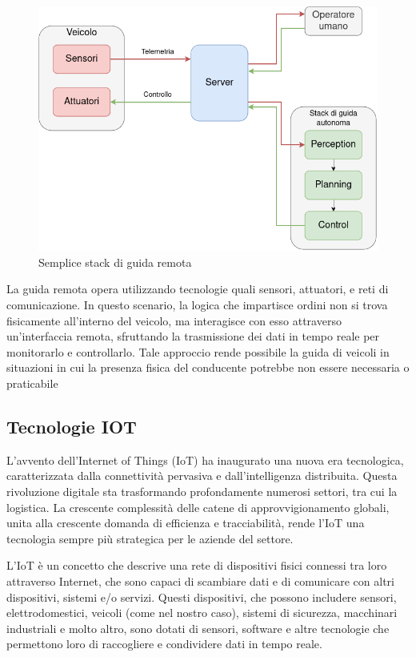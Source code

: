 \begin{figure}[H]
  \centering
  \includegraphics[width=1\textwidth]{figures/guida_remota.png}
  \caption{Semplice stack di guida remota}
  \label{guida_remota}
\end{figure}

\noindent La guida remota opera utilizzando tecnologie quali sensori, attuatori, e reti di comunicazione. In questo scenario, la logica che impartisce ordini non si trova fisicamente all'interno del veicolo, ma interagisce con esso attraverso un'interfaccia remota, sfruttando la trasmissione dei dati in tempo reale per monitorarlo e controllarlo. Tale approccio rende possibile la guida di veicoli in situazioni in cui la presenza fisica del conducente potrebbe non essere necessaria o praticabile

\subsection{Tecnologie IOT}
L'avvento dell'Internet of Things (IoT) ha inaugurato una nuova era tecnologica, caratterizzata dalla connettività pervasiva e dall'intelligenza distribuita. Questa rivoluzione digitale sta trasformando profondamente numerosi settori, tra cui la logistica. La crescente complessità delle catene di approvvigionamento globali, unita alla crescente domanda di efficienza e tracciabilità, rende l'IoT una tecnologia sempre più strategica per le aziende del settore.

\noindent L'IoT è un concetto che descrive una rete di dispositivi fisici connessi tra loro attraverso Internet, che sono capaci di scambiare dati e di comunicare con altri dispositivi, sistemi e/o servizi. Questi dispositivi, che possono includere sensori, elettrodomestici, veicoli (come nel nostro caso), sistemi di sicurezza, macchinari industriali e molto altro, sono dotati di sensori, software e altre tecnologie che permettono loro di raccogliere e condividere dati in tempo reale.

